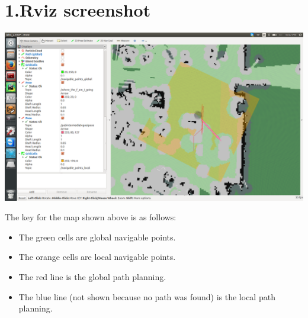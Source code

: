\documentclass{article}
\begin{document}
\mdxtitleblockstart{}
\mdxauthorstart{}
\mdxauthorend\mdtitleauthorrunning{}{}\mdxtitleblockend%

\section{1.\hspace*{0.5em}Rviz screenshot}\label{sec-rviz-screenshot}%

\noindent{}\includegraphics[keepaspectratio=true,width=\dimmin{}{\dimwidth{0.90}}]{images/Screenshot-from-2016-04-17-22-47-49}{}%

\noindent{}The key for the map shown above is as follows:%

\begin{itemize}[noitemsep,topsep=\mdcompacttopsep]%

\item{}The green cells are global navigable points.%

\item{}The orange cells are local navigable points.%

\item{}The red line is the global path planning.%

\item{}The blue line (not shown because no path was found) is the local path planning.%
\end{itemize}%
\end{document}
